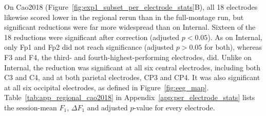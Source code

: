 On Cao2018 (Figure~\ref{fig:exp1_subset_per_electrode_stats}B), all 18 electrodes likewise scored lower in the regional rerun than in the full-montage run, but significant reductions were far more widespread than on Internal. Sixteen of the 18 reductions were significant after correction (adjusted $p < 0.05$). As on Internal, only Fp1 and Fp2 did not reach significance (adjusted $p > 0.05$ for both), whereas F3 and F4, the third- and fourth-highest-performing electrodes, did. Unlike on Internal, the reduction was significant at all six central electrodes, including both C3 and C4, and at both parietal electrodes, CP3 and CP4. It was also significant at all six occipital electrodes, as defined in Figure~\ref{fig:eeg_map}. Table~\ref{tab:app_regional_cao2018} in Appendix~\ref{app:per_electrode_stats} lists the session-mean $F_1$, $\Delta F_1$ and adjusted $p$-value for every electrode.
